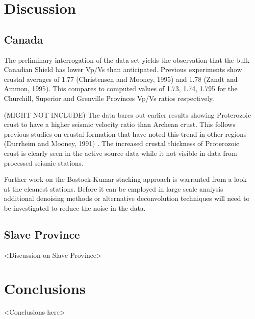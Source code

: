\documentclass[draft, 12pt]{article}
\begin{document}
\section{Discussion}
\subsection{Canada}

  The preliminary interrogation of the data set yields the observation that the bulk Canadian Shield has lower Vp/Vs than anticipated. Previous experiments show crustal averages of 1.77 (Christensen and Mooney, 1995) and 1.78 (Zandt and Ammon, 1995). This compares to computed values of 1.73, 1.74, 1.795 for the Churchill, Superior and Grenville Provinces Vp/Vs ratios respectively.


(MIGHT NOT INCLUDE)  The data bares out earlier results showing Proterozoic crust to have a higher seismic velocity ratio than Archean crust. This follows previous studies on crustal formation that have noted this trend in other regions (Durrheim and Mooney, 1991) . The increased crustal thickness of Proterozoic crust is clearly seen in the active source data while it not visible in data from processed seismic stations.

  Further work on the Bostock-Kumar stacking approach is warranted from a look at the cleanest stations. Before it can be employed in large scale analysis additional denoising methods or alternative deconvolution techniques will need to be investigated to reduce the noise in the data.


\subsection{Slave Province}
<Discussion on Slave Province>

\section{Conclusions}
<Conclusions here>




\begin{thebibliography}{}


\end{thebibliography}
\end{document}
